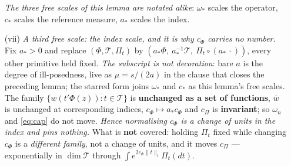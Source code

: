 \begin{lemma}
\begin{enumerate}
\emph{The three free scales of this lemma are notated alike}: $\omega_\ast$ scales the operator,
$c_\ast$ scales the reference measure, $a_\ast$ scales the index.
\item[(vii)] \emph{A third free scale: the index scale, and it is why $c_\Phi$ carries no number.}
Fix $a_\ast>0$ and replace $(\Phi,\mathcal T,\Pi_t)$ by
$(a_\ast\Phi,\ a_\ast^{-1}\mathcal T,\ \Pi_t\circ(a_\ast\,\cdot))$,
every other primitive held fixed. \emph{The subscript is not decoration}: bare $a$ is the degree of
ill-posedness, live as $\mu=s/(2a)$ in the clause that closes the preceding lemma; the starred form
joins $\omega_\ast$ and $c_\ast$ as this lemma's free scales. The family
$\{w(t'\Phi(z)):t\in\mathcal T\}$ is \textbf{unchanged as a
set of functions}, $\bar w$ is unchanged at corresponding indices, $c_\Phi\mapsto a_\ast c_\Phi$ and $c_\Pi$
is \textbf{invariant}; so $\omega_n$ and \eqref{eq:cap} do not move. \emph{Hence normalising $c_\Phi$ is
a change of units in the index and pins nothing.} What is \textbf{not} covered: holding $\Pi_t$ fixed
while changing $c_\Phi$ is a \emph{different family}, not a change of units, and it moves $c_\Pi$ ---
exponentially in $\dim\mathcal T$ through $\int e^{2c_\Phi\|t\|_1}\Pi_t(dt)$.
\end{enumerate}


\end{lemma}

